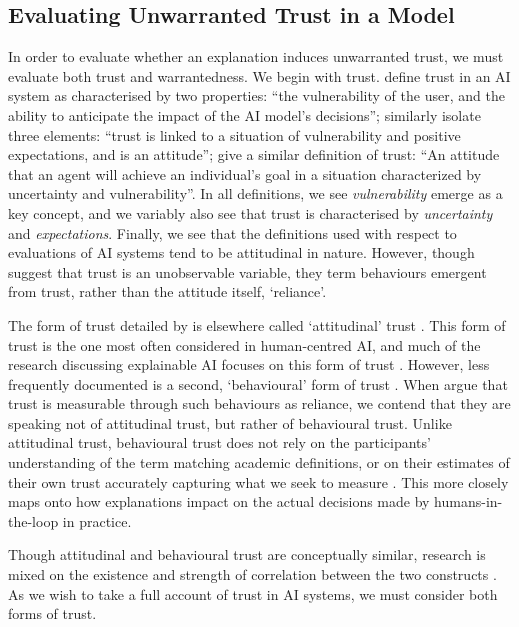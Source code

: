 \subsection{Evaluating Unwarranted Trust in a Model}
In order to evaluate whether an explanation induces unwarranted trust, we must evaluate both trust and warrantedness. We begin with trust. \textcite{Jacovi-et-al} define trust in an AI system as characterised by two properties: ``the vulnerability of the user, and the ability to anticipate the impact of the AI model's decisions''; \textcite{Vereschak-et-al} similarly isolate three elements: ``trust is linked to a situation of vulnerability and positive expectations, and is an attitude''; \textcite{Lee-and-See} give a similar definition of trust: ``An attitude that an agent will achieve an individual's goal in a situation characterized by uncertainty and vulnerability''. In all definitions, we see \emph{vulnerability} emerge as a key concept, and we variably also see that trust is characterised by \emph{uncertainty} and \emph{expectations}. Finally, we see that the definitions used with respect to evaluations of AI systems tend to be attitudinal in nature. However, though \textcite{Vereschak-et-al} suggest that trust is an unobservable variable, they term behaviours emergent from trust, rather than the attitude itself, `reliance'. 

The form of trust detailed by \textcite{Vereschak-et-al} is elsewhere called `attitudinal' trust \cite{Crites-et-al}. This form of trust is the one most often considered in human-centred AI, and much of the research discussing explainable AI focuses on this form of trust \cite{Vereschak-et-al, Ford-et-al, Bansal-et-al, Yin-et-al}. However, less frequently documented is a second, `behavioural' form of trust \cite{Crites-et-al}. When \textcite{Jacovi-et-al,Lee-and-See} argue that trust is measurable through such behaviours as reliance, we contend that they are speaking not of attitudinal trust, but rather of behavioural trust. Unlike attitudinal trust, behavioural trust does not rely on the participants' understanding of the term matching academic definitions, or on their estimates of their own trust accurately capturing what we seek to measure \cite{Jacovi-et-al}. This more closely maps onto how explanations impact on the actual decisions made by humans-in-the-loop in practice.

Though attitudinal and behavioural trust are conceptually similar, research is mixed on the existence and strength of correlation between the two constructs \cite{Ahmed-and-Salas, Kim}. As we wish to take a full account of trust in AI systems, we must consider both forms of trust.

